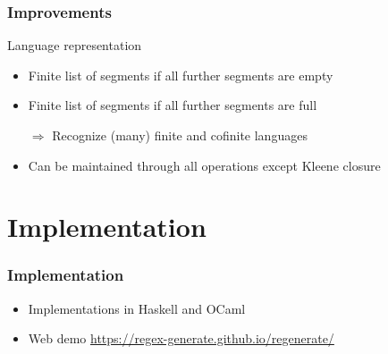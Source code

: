 \documentclass[pdftex,aspectratio=169]{beamer}
\begin{document}
\begin{frame}
  \frametitle{Improvements}
  \begin{block}{Language representation}
  \begin{itemize}
  \item Finite list of segments if all further segments are empty
  \item Finite list of segments if all further segments are full
  \item[$\Rightarrow$] Recognize (many) finite and cofinite languages
  \item Can be maintained through all operations except Kleene closure
  \end{itemize}
\end{block}
\end{frame}
\section{Implementation}
\begin{frame}
  \frametitle{Implementation}
  \begin{itemize}
  \item Implementations in Haskell and OCaml
  \item Web demo \url{https://regex-generate.github.io/regenerate/}
  \end{itemize}
\end{frame}
      
\end{document}
